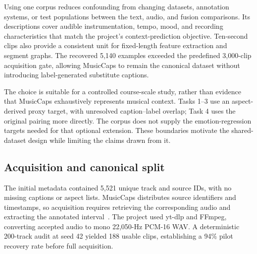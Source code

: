 \documentclass[conference]{IEEEtran}
\begin{document}
Using one corpus reduces confounding from changing datasets, annotation systems, or test populations between the text, audio, and fusion comparisons. Its descriptions cover audible instrumentation, tempo, mood, and recording characteristics that match the project's context-prediction objective. Ten-second clips also provide a consistent unit for fixed-length feature extraction and segment graphs. The recovered 5,140 examples exceeded the predefined 3,000-clip acquisition gate, allowing MusicCaps to remain the canonical dataset without introducing label-generated substitute captions.

The choice is suitable for a controlled course-scale study, rather than evidence that MusicCaps exhaustively represents musical context. Tasks 1--3 use an aspect-derived proxy target, with unresolved caption--label overlap; Task 4 uses the original pairing more directly. The corpus does not supply the emotion-regression targets needed for that optional extension. These boundaries motivate the shared-dataset design while limiting the claims drawn from it.

\subsection{Acquisition and canonical split}
The initial metadata contained 5,521 unique track and source IDs, with no missing captions or aspect lists. MusicCaps distributes source identifiers and timestamps, so acquisition requires retrieving the corresponding audio and extracting the annotated interval~\cite{musiccaps}. The project used yt-dlp and FFmpeg, converting accepted audio to mono 22,050-Hz PCM-16 WAV. A deterministic 200-track audit at seed 42 yielded 188 usable clips, establishing a 94\% pilot recovery rate before full acquisition.
\end{document}
